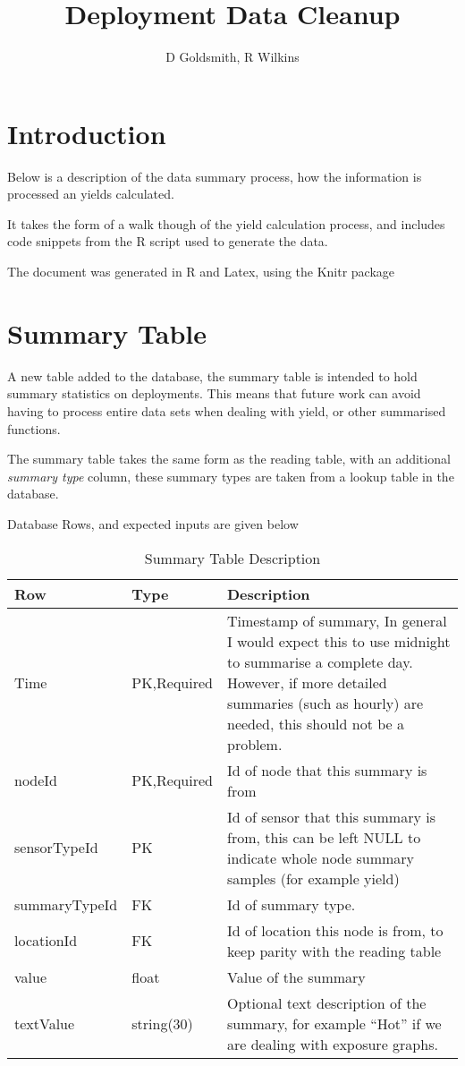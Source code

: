 \documentclass[10pt,a4paper]{article}\usepackage{graphicx, color}
\title{Deployment Data Cleanup}
\author{D Goldsmith, R Wilkins}
\begin{document}
\maketitle

\section{Introduction}

Below is a description of the data summary process, how the information is
processed an yields calculated.

It takes the form of a walk though of the yield calculation process, and
includes code snippets from the R script used to generate the data.

The document was generated in R and Latex, using the Knitr package


\section{Summary Table}
A new table added to the database, the summary table is intended to hold summary
statistics on deployments.  This means that future work can avoid having to
process entire data sets when dealing with yield, or other summarised functions.  

The summary table takes the same form as the reading table, with an additional
\emph{summary type} column,  these summary types are taken from a lookup
table in the database.

Database Rows, and expected inputs are given below

\begin{table}[htbp]
  \centering
  \begin{tabular}{l l p{6cm}}
    Row & Type & Description \\ \hline
    Time & PK,Required & Timestamp of summary, In general I would expect
  this to use midnight to summarise a complete day. However, if more detailed
  summaries (such as hourly) are needed, this should not be a problem.\\
    nodeId &PK,Required & Id of node that this summary is from\\
    sensorTypeId &PK & Id of sensor that this summary is from,  this
  can be left NULL to indicate whole node summary samples (for example yield)\\
    summaryTypeId &FK &  Id of summary type.\\
    locationId & FK & Id of location this node is from,  to keep
  parity with the reading table\\
    value & float& Value of the summary\\
    textValue & string(30)& Optional text description of the summary, for example ``Hot''
  if we are dealing with exposure graphs.\\
    
  \end{tabular}
  \caption{Summary Table Description}
\end{table}
\end{document}
